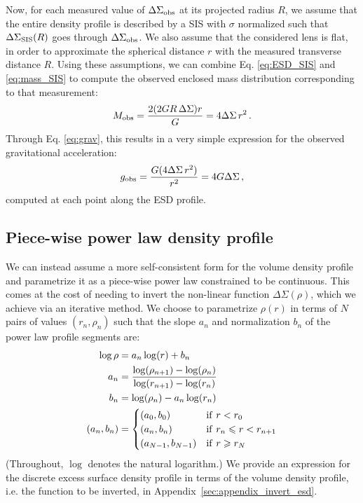 \documentclass[usenatbib]{mnras}
\newcommand{\un}[1]{_{\rm #1}}
\begin{document}
Now, for each measured value of $\Delta\Sigma\un{obs}$ at its projected radius $R$, we assume that the entire density profile is described by a SIS with $\sigma$ normalized such that $\Delta\Sigma\un{SIS}(R)$ goes through $\Delta\Sigma\un{obs}$. We also assume that the considered lens is flat, in order to approximate the spherical distance $r$ with the measured transverse distance $R$. Using these assumptions, we can combine Eq. \ref{eq:ESD_SIS} and \ref{eq:mass_SIS} to compute the observed enclosed mass distribution corresponding to that measurement:
\begin{equation}
	M\un{obs} = \frac{2 (2 G R \, \Delta\Sigma) r}{G} = 4 \Delta\Sigma \, r^2 \, .
\end{equation}
Through Eq. \ref{eq:grav}, this results in a very simple expression for the observed gravitational acceleration:
\begin{equation}
g\un{obs} = \frac{G (4 \Delta\Sigma \, r^2)}{r^2} = 4 G \Delta\Sigma \, ,
\end{equation}
computed at each point along the ESD profile.


\subsection{Piece-wise power law density profile}
\label{sec:piece-wise_powerlaw}

We can instead assume a more self-consistent form for the volume density profile and parametrize it as a piece-wise power law constrained to be continuous. This comes at the cost of needing to invert the non-linear function $\Delta\Sigma(\rho)$, which we achieve via an iterative method. We choose to parametrize $\rho(r)$ in terms of $N$ pairs of values $(r_n,\rho_n)$ such that the slope $a_n$ and normalization $b_n$ of the power law profile segments are:
\begin{align}
\log\rho &= a_n \log(r) + b_n \\
a_n &= \frac{\log(\rho_{n+1})-\log(\rho_n)}{\log(r_{n+1})-\log(r_n)}\\
b_n &= \log(\rho_n) - a_n\log(r_n)\\
(a_n, b_n) &=
\begin{cases}
(a_0, b_0) & {\rm if}\ r < r_0\\
(a_n, b_n) & {\rm if}\ r_n \leq r < r_{n+1}\\
(a_{N-1}, b_{N-1}) & {\rm if}\ r \geq r_N
\end{cases}
\label{eq:rho_piecewise_powerlaw}\end{align}
(Throughout, $\log$ denotes the natural logarithm.) We provide an expression for the discrete excess surface density profile in terms of the volume density profile, i.e. the function to be inverted, in Appendix~\ref{sec:appendix_invert_esd}.
\end{document}
